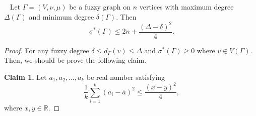 \documentclass[10pt,a4paper]{amsart}
\newcommand{\SF}{\sigma^*}
\begin{document}
\begin{proposition}~\label{Boundsfuzzy01}
Let $\Gamma=(V, \nu,\mu)$ be a fuzzy graph on $n$ vertices with  maximum degree $\Delta(\Gamma)$ and minimum degree $\delta(\Gamma)$. Then
\begin{equation}~\label{eqq1Boundsfuzzy01}
\SF(\Gamma)\leqslant 2n+\frac{(\Delta-\delta)^2}{4}.
\end{equation}
\end{proposition}

\begin{proof}
For any fuzzy degree $\delta\leqslant d_\Gamma(v)\leqslant\Delta$ and $\SF(\Gamma)\geq 0$  where $v\in V(\Gamma)$. Then, we should be prove the following claim. 

\noindent \textbf{Claim 1.} Let $a_1,a_2,\dots,a_k$ be real number satisfying 
\begin{equation}~\label{eqq2Boundsfuzzy01}
\frac{1}{k}\sum_{i=1}^{k}(a_i-\bar{a})^2\leqslant \frac{(x-y)^2}{4},    
\end{equation}
where $x,y\in \mathbb{R}$. 


\end{proof}
\end{document}
